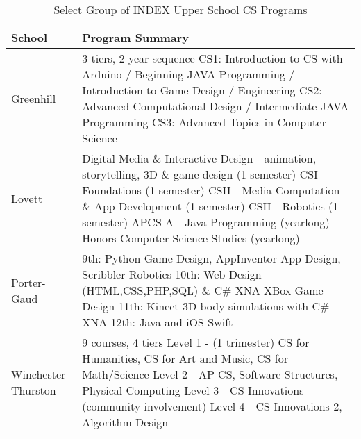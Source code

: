 \begin{table}[]
\centering
\caption{Select Group of INDEX Upper School CS Programs}
\label{indexCScourses}
\begin{tabular}{|l|p{10cm}|} \hline
\textbf{School}     & \textbf{Program Summary} \\\hline

Greenhill & 				3 tiers, 2 year sequence \newline
							CS1: Introduction to CS with Arduino / Beginning JAVA Programming / Introduction to Game Design / Engineering \newline
							CS2: Advanced Computational Design / Intermediate JAVA Programming \newline
							CS3: Advanced Topics in Computer Science \\ \hline
Lovett &					Digital Media \& Interactive Design - animation, storytelling, 3D \& game design (1 semester) \newline
							CSI - Foundations (1 semester)\newline
							CSII - Media Computation \& App Development  (1 semester) \newline
							CSII - Robotics (1 semester) \newline
							APCS A - Java Programming (yearlong) \newline
							Honors Computer Science Studies (yearlong) \\ \hline
Porter-Gaud &				9th: Python Game Design, AppInventor App Design, Scribbler Robotics \newline
							10th: Web Design (HTML,CSS,PHP,SQL) \& C\#-XNA XBox Game Design \newline
							11th: Kinect 3D body simulations with C\#-XNA \newline
							12th: Java and iOS Swift \\ \hline
Winchester Thurston &		9 courses, 4 tiers \newline
							Level 1 - (1 trimester) CS for Humanities, CS for Art and Music, CS for Math/Science \newline
							Level 2 - AP CS, Software Structures, Physical Computing \newline
							Level 3 - CS Innovations (community involvement) \newline
							Level 4 - CS Innovations 2, Algorithm Design \\\hline

\end{tabular}
\end{table}
